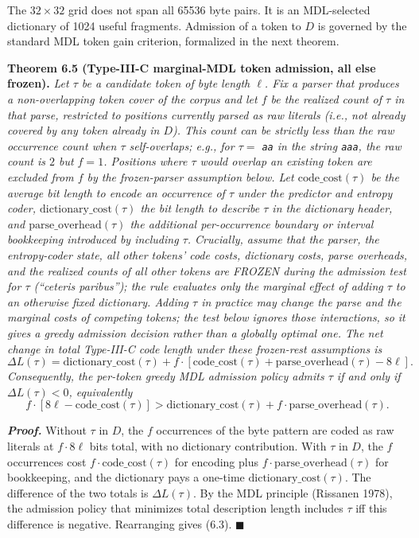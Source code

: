 \documentclass[
]{article}
\begin{document}
The $32 \times 32$ grid does not span all 65536 byte pairs. It is an
MDL-selected dictionary of 1024 useful fragments. Admission of a token
to $D$ is governed by the standard MDL token gain criterion,
formalized in the next theorem.

\textbf{Theorem 6.5 (Type-III-C marginal-MDL token admission, all
else frozen).} \emph{Let $\tau$ be a candidate token of byte length
$\ell$. Fix a parser that produces a non-overlapping token cover of
the corpus and let $f$ be the \emph{realized} count of $\tau$ in
that parse, restricted to positions currently parsed as raw
literals (i.e., not already covered by any token already in $D$).
This count can be strictly less than the raw occurrence count when
$\tau$ self-overlaps; e.g., for $\tau = $ \texttt{aa} in the
string \texttt{aaa}, the raw count is $2$ but $f = 1$. Positions
where $\tau$ would overlap an existing token are excluded from $f$
by the frozen-parser assumption below. Let
$\mathrm{code\_cost}(\tau)$ be the average bit length to encode an
occurrence of $\tau$ under the predictor and entropy coder,
$\mathrm{dictionary\_cost}(\tau)$ the bit length to describe $\tau$
in the dictionary header, and $\mathrm{parse\_overhead}(\tau)$ the
additional per-occurrence boundary or interval bookkeeping
introduced by including $\tau$. \emph{Crucially, assume that the
parser, the entropy-coder state, all other tokens' code costs,
dictionary costs, parse overheads, and the realized counts of all
other tokens are FROZEN during the admission test for $\tau$
(``ceteris paribus''); the rule evaluates only the marginal effect
of adding $\tau$ to an otherwise fixed dictionary. Adding $\tau$ in
practice may change the parse and the marginal costs of competing
tokens; the test below ignores those interactions, so it gives a
greedy admission decision rather than a globally optimal one.} The
net change in total Type-III-C code length under these frozen-rest
assumptions is}
\[
\Delta L(\tau) = \mathrm{dictionary\_cost}(\tau) + f \cdot \left[\mathrm{code\_cost}(\tau) + \mathrm{parse\_overhead}(\tau) - 8\ell\right].
\]
\emph{Consequently, the per-token greedy MDL admission policy admits
$\tau$ if and only if $\Delta L(\tau) < 0$, equivalently}
\[
f \cdot \left[8\ell - \mathrm{code\_cost}(\tau)\right] > \mathrm{dictionary\_cost}(\tau) + f \cdot \mathrm{parse\_overhead}(\tau).
\tag{6.3}
\]

\emph{\textbf{Proof.}} Without $\tau$ in $D$, the $f$ occurrences of
the byte pattern are coded as raw literals at $f \cdot 8\ell$ bits
total, with no dictionary contribution. With $\tau$ in $D$, the $f$
occurrences cost $f \cdot \mathrm{code\_cost}(\tau)$ for encoding plus
$f \cdot \mathrm{parse\_overhead}(\tau)$ for bookkeeping, and the
dictionary pays a one-time $\mathrm{dictionary\_cost}(\tau)$. The
difference of the two totals is $\Delta L(\tau)$. By the MDL
principle (Rissanen 1978), the admission policy that minimizes total
description length includes $\tau$ iff this difference is negative.
Rearranging gives (6.3). \hfill$\blacksquare$
\end{document}
